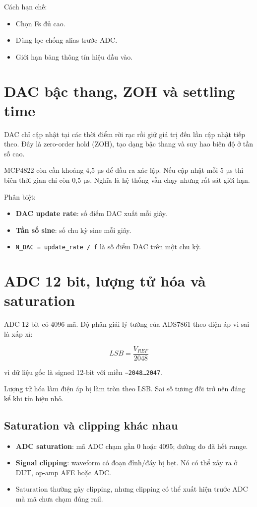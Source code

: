 \documentclass[12pt,a4paper,oneside]{article}
\newcommand{\inlinecode}[1]{\texttt{#1}}
\begin{document}
Cách hạn chế:

\begin{itemize}
\item Chọn Fs đủ cao.
\item Dùng lọc chống alias trước ADC.
\item Giới hạn băng thông tín hiệu đầu vào.
\end{itemize}

\section{DAC bậc thang, ZOH và settling time}

DAC chỉ cập nhật tại các thời điểm rời rạc rồi giữ giá trị đến lần cập nhật tiếp theo. Đây là zero-order hold (ZOH), tạo dạng bậc thang và suy hao biên độ ở tần số cao.

MCP4822 còn cần khoảng 4,5 µs để đầu ra xác lập. Nếu cập nhật mỗi 5 µs thì biên thời gian chỉ còn 0,5 µs. Nghĩa là hệ thống vẫn chạy nhưng rất sát giới hạn.

Phân biệt:

\begin{itemize}
\item \textbf{DAC update rate}: số điểm DAC xuất mỗi giây.
\item \textbf{Tần số sine}: số chu kỳ sine mỗi giây.
\item \inlinecode{N\_DAC = update\_rate / f} là số điểm DAC trên một chu kỳ.
\end{itemize}

\section{ADC 12 bit, lượng tử hóa và saturation}

ADC 12 bit có 4096 mã. Độ phân giải lý tưởng của ADS7861 theo điện áp vi sai là xấp xỉ:

\[
LSB=\frac{V_{REF}}{2048}
\]

vì dữ liệu gốc là signed 12-bit với miền \inlinecode{−2048…2047}.

Lượng tử hóa làm điện áp bị làm tròn theo LSB. Sai số tương đối trở nên đáng kể khi tín hiệu nhỏ.

\subsection{Saturation và clipping khác nhau}

\begin{itemize}
\item \textbf{ADC saturation}: mã ADC chạm gần 0 hoặc 4095; đường đo đã hết range.
\item \textbf{Signal clipping}: waveform có đoạn đỉnh/đáy bị bẹt. Nó có thể xảy ra ở DUT, op-amp AFE hoặc ADC.
\item Saturation thường gây clipping, nhưng clipping có thể xuất hiện trước ADC mà mã chưa chạm đúng rail.
\end{itemize}
\end{document}
